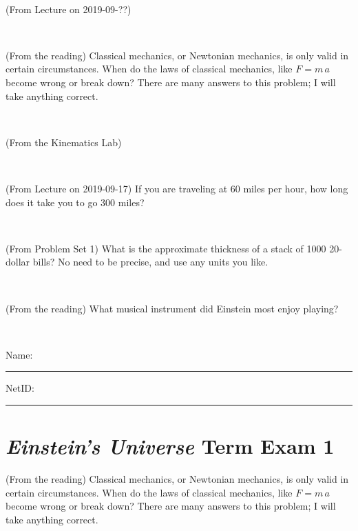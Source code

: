 \documentclass[12pt, letterpaper]{article}
\begin{document}
\vfill ~

\begin{problem} (From Lecture on 2019-09-??)
\end{problem}


\vfill ~

\begin{problem} (From the reading)
Classical mechanics, or Newtonian mechanics, is only valid in certain
circumstances. When do the laws of classical mechanics, like $F =
m\,a$ become wrong or break down? There are many answers to this
problem; I will take anything correct.
\end{problem}


\vfill ~


\clearpage


\begin{problem} (From the Kinematics Lab)

\end{problem}


\vfill ~

\begin{problem} (From Lecture on 2019-09-17)
If you are traveling at 60 miles per hour, how long does
it take you to go 300 miles?
\end{problem}


\vfill ~

\begin{problem} (From Problem Set 1)
What is the approximate thickness of a stack of 1000 20-dollar bills?
No need to be precise, and use any units you like.
\end{problem}


\vfill ~

\begin{problem} (From the reading)
What musical instrument did Einstein most enjoy playing?
\end{problem}


\vfill ~


\cleardoublepage



\noindent
Name: \rule[-1ex]{0.60\textwidth}{0.1pt}
NetID: \rule[-1ex]{0.20\textwidth}{0.1pt}

\section*{\textsl{Einstein's Universe} Term Exam 1}
\setcounter{problem}{1}


\begin{problem} (From the reading)
Classical mechanics, or Newtonian mechanics, is only valid in certain
circumstances. When do the laws of classical mechanics, like $F =
m\,a$ become wrong or break down? There are many answers to this
problem; I will take anything correct.
\end{problem}
\end{document}
